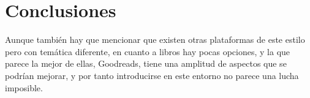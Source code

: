 \section{Conclusiones}

Aunque también hay que mencionar que existen otras plataformas de este estilo pero con temática diferente, en cuanto a libros hay pocas opciones, y la que parece la mejor de ellas, Goodreads\cite{Goodreads}, tiene una amplitud de aspectos que se podrían mejorar, y por tanto introducirse en este entorno no parece una lucha imposible.